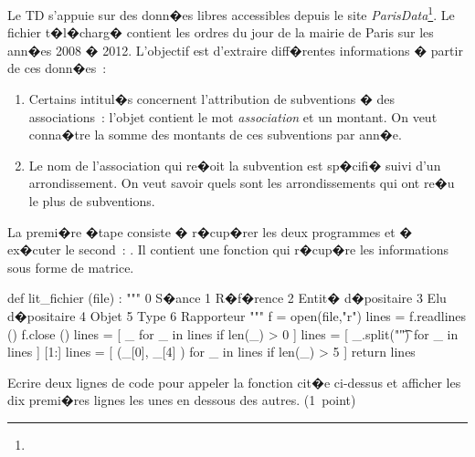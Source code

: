 %




\exosubject{}
\begin{xexercice}\label{td_note_2013_r}%

Le TD s'appuie sur des donn�es libres accessibles depuis le site \textit{ParisData}\footnote{}. Le fichier t�l�charg� contient les ordres du jour de la mairie de Paris sur les ann�es 2008 � 2012. L'objectif est d'extraire diff�rentes informations � partir de ces donn�es~:
\begin{enumerate}
\item Certains intitul�s concernent l'attribution de subventions � des associations~: l'objet contient le mot \textit{association} et un montant. On veut conna�tre la somme des montants de ces subventions par ann�e.
\item Le nom de l'association qui re�oit la subvention est sp�cifi� suivi d'un arrondissement. On veut savoir quels sont les arrondissements qui ont re�u le plus de subventions.
\end{enumerate}


La premi�re �tape consiste � r�cup�rer les deux programmes \pythons et � ex�cuter le second~: .  Il contient une fonction qui r�cup�re les informations sous forme de matrice.

\begin{verbatimx}
def lit_fichier (file) :
    """
    0 S�ance 	
    1 R�f�rence	
    2 Entit� d�positaire	
    3 Elu d�positaire	
    4 Objet	
    5 Type	
    6 Rapporteur
    """
    f = open(file,"r")
    lines = f.readlines ()
    f.close ()
    lines = [ _ for _ in lines if len(_) > 0 ]
    lines = [ _.split("\t") for _ in lines ] [1:]
    lines = [ (_[0], _[4] ) for _ in lines if len(_) > 5 ]
    return lines
\end{verbatimx}

\exequest Ecrire deux lignes de code pour appeler la fonction cit�e ci-dessus et afficher les dix premi�res lignes les unes en dessous des autres. (1~point)


\end{xexercice}
